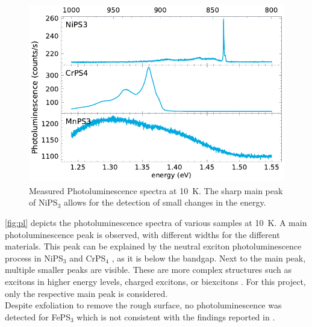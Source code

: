 \documentclass[
	twoside,
	parskip=half,
	a4paper,
]{scrbook}
\begin{document}
\begin{figure}
	\centering
	\includegraphics{../figures/2023-12-10 Combined PL.pdf}
	\caption{Measured Photoluminescence spectra at \SI{10}{K}. The sharp main peak of NiPS$_3$ allows for the detection of small changes in the energy.}
	\label{fig:pl}
\end{figure}
\autoref{fig:pl} depicts the photoluminescence spectra of various samples at \SI{10}{K}.
A main photoluminescence peak is observed, with different widths for the different materials. 
This peak can be explained by the neutral exciton photoluminescence process in NiPS$_3$ and CrPS$_4$ \cite{NiPS3_exciton,CrPS4_pl}, as it is below the bandgap.
Next to the main peak, multiple smaller peaks are visible.
These are more complex structures such as excitons in higher energy levels, charged excitons, or biexcitons \cite{CrPS4_pl, NiPS3_exciton,NiPS3_anisotropic, NiPS3_coherent}.
For this project, only the respective main peak is considered.\\
Despite exfoliation to remove the rough surface, no photoluminescence was detected for FePS$_3$ which is not consistent with the findings reported in \cite{FePS3_pl}.
\end{document}
